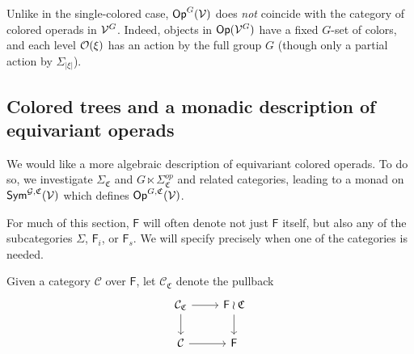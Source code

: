 \documentclass[a4paper,10pt
,draft
]{article}%
\renewcommand{\1}{\eta}%
\newcommand{\SC}{\Sigma_{\mathfrak C}}
\begin{document}
\begin{remark}
	Unlike in the single-colored case, $\mathsf{Op}^G(\mathcal V)$ does \textit{not} coincide with the category of colored operads in $\mathcal V^G$.
	Indeed, objects in $\mathsf{Op}(\mathcal V^G)$ have a fixed $G$-set of colors,
        and each level $\mathcal{O}(\xi)$ has an action by the full group $G$
	(though only a partial action by $\Sigma_{|\xi|}$).
\end{remark}




\subsection{Colored trees and a monadic description of equivariant operads}
\label{COMEGA_SEC}


We would like a more algebraic description of equivariant colored operads.
To do so, we investigate $\SC$ and $G \ltimes \Sigma_{\mathfrak C}^{op}$ and related categories,
leading to a monad on $\mathsf{Sym}^{\mathcal{G}, \mathfrak C}(\mathcal V)$ which defines $\mathsf{Op}^{G, \mathfrak C}(\mathcal V)$.


\begin{remark}
      For much of this section, $\mathsf F$ will often denote not just $\mathsf F$ itself, but also any of the subcategories
      $\Sigma$, $\mathsf F_i$, or $\mathsf F_s$.
      We will specify precisely when one of the categories is needed.
\end{remark}

\begin{definition}
      Given a category $\mathcal C$ over $\mathsf F$, let $\mathcal C_{\mathfrak C}$ denote the pullback
      \begin{equation}
            \begin{tikzcd}
                  \mathcal C_{\mathfrak C} \arrow[r] \arrow[d]
                  &
                  \mathsf F \wr \mathfrak C \arrow[d]
                  \\
                  \mathcal C \arrow[r]
                  &
                  \mathsf F
            \end{tikzcd}
      \end{equation}
\end{definition}
\end{document}
